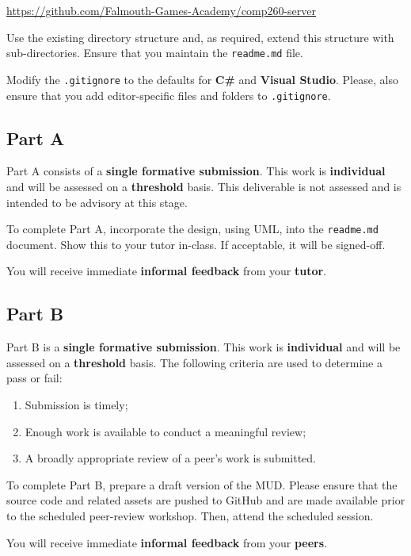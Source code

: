 \documentclass{../../fal_assignment}
\begin{document}
\indent \url{https://github.com/Falmouth-Games-Academy/comp260-server}

Use the existing directory structure and, as required, extend this structure with sub-directories. Ensure that you maintain the \texttt{readme.md} file.

Modify the \texttt{.gitignore} to the defaults for \textbf{C\#} and \textbf{Visual Studio}. Please, also ensure that you add editor-specific files and folders to \texttt{.gitignore}. 

\subsection*{Part A}

Part A consists of a \textbf{single formative submission}. This work is \textbf{individual} and will be assessed on a \textbf{threshold} basis. This deliverable is not assessed and is intended to be advisory at this stage.

To complete Part A, incorporate the design, using UML, into the \texttt{readme.md} document.  Show this to your tutor in-class.  If acceptable, it will be signed-off. 

You will receive immediate \textbf{informal feedback} from your \textbf{tutor}.

\subsection*{Part B}

Part B is a \textbf{single formative submission}. This work is \textbf{individual} and will be assessed on a \textbf{threshold} basis. The following criteria are used to determine a pass or fail:

\begin{enumerate}[label=(\alph*)]
	\item Submission is timely;
	\item Enough work is available to conduct a meaningful review;
	\item A broadly appropriate review of a peer's work is submitted.
\end{enumerate}

To complete Part B, prepare a draft version of the MUD. Please ensure that the source code and related assets are pushed to GitHub and are made available prior to the scheduled peer-review workshop. Then, attend the scheduled session.

You will receive immediate \textbf{informal feedback} from your \textbf{peers}.
\end{document}
